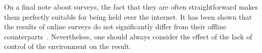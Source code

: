 On a final note about surveys, the fact that they are often straightforward makes them perfectly suitable for being held over the internet. It has been shown that the results of online surveys do not significantly differ from their offline counterparts~\cite{komarov2013crowdsourcing}. Nevertheless, one should always consider the effect of the lack of control of the environment on the result. %

